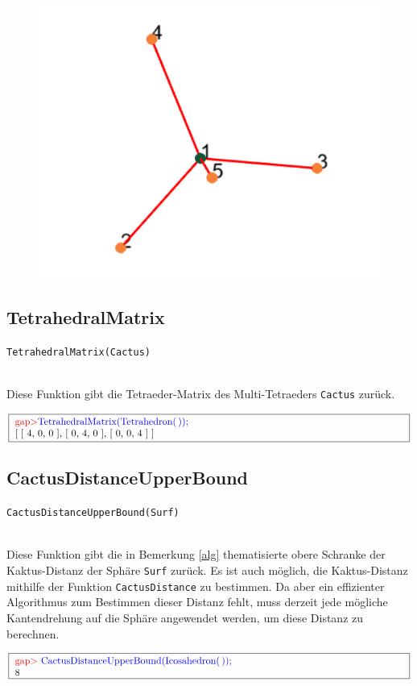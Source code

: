 \documentclass[12pt,titlepage,twoside,cleardoublepage]{article}
\theoremstyle{nummermitklammern}
\numberwithin{equation}{section}
\begin{document}
 \begin{figure}[H]
\begin{center}
\includegraphics[scale=0.5,viewport=0cm 1.5cm 12cm 11cm]{sterngraph}
\end{center}
\end{figure}
\subsection{TetrahedralMatrix}
\begin{large}
\texttt{TetrahedralMatrix(Cactus)}
\end{large}\\
Diese Funktion gibt die Tetraeder-Matrix des Multi-Tetraeders  \texttt{Cactus} zurück.
\begin{center}
$\fbox{
\parbox{14cm}{
\textcolor{red}{gap$>$}\textcolor{blue}{ TetrahedralMatrix(Tetrahedron(\,));}\newline
 [ [ 4, 0, 0 ], [ 0, 4, 0 ], [ 0, 0, 4 ] ]
}
}$
\end{center}
\subsection{CactusDistanceUpperBound}
\begin{large}
\texttt{CactusDistanceUpperBound(Surf)}
\end{large}\\
Diese Funktion gibt die in Bemerkung \ref{alg} thematisierte obere Schranke der Kaktus-Distanz der Sphäre \texttt{Surf} zurück.
Es ist auch möglich, die Kaktus-Distanz mithilfe der Funktion \texttt{CactusDistance} zu bestimmen. Da aber ein effizienter Algorithmus zum Bestimmen dieser Distanz fehlt, muss derzeit jede mögliche Kantendrehung auf die Sphäre angewendet werden, um diese Distanz zu berechnen. 
\begin{center}
$\fbox{
\parbox{14cm}{
\textcolor{red}{gap$>$} \textcolor{blue}{CactusDistanceUpperBound(Icosahedron(\,));}\newline
8
}
}$
\end{center}
\end{document}
